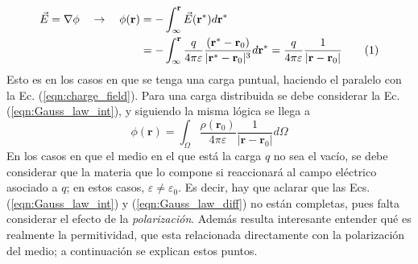 \documentclass[12pt, oneside, numbers, spanish]{ezthesis}
\newcommand\numberthis{\addtocounter{equation}{1}\tag{\theequation}}
\numberwithin{equation}{section}
\begin{document}
\begin{align*}\label{eqn:potential}
\vec{E} = \nabla\phi \quad\rightarrow\quad\phi{(\mathbf{r})} & = -\int_\infty^{\mathbf{r}} \vec{E}(\mathbf{r}^*) d\mathbf{r}^* \\
& = -\int_\infty^{\mathbf{r}} \frac{q}{4\pi\varepsilon}\frac{(\mathbf{r}^*-\mathbf{r}_0)}{|\mathbf{r}^* - \mathbf{r}_0|^3} d\mathbf{r}^* = \frac{q}{4\pi\varepsilon}\frac{1}{|\mathbf{r} - \mathbf{r}_0|}\numberthis
\end{align*}
Esto es en los casos en que se tenga una carga puntual, haciendo el paralelo con la Ec. (\ref{eqn:charge_field}). Para una carga distribuida se debe considerar la Ec. (\ref{eqn:Gauss_law_int}), y siguiendo la misma lógica se llega a
\begin{equation}\label{eqn:integral_potential}
\phi(\mathbf{r}) = \int_\Omega \frac{\rho(\mathbf{r}_0)}{4\pi\varepsilon}\frac{1}{|\mathbf{r}-\mathbf{r}_0|}d\Omega
\end{equation}
En los casos en que el medio en el que está la carga $q$ no sea el vacío, se debe considerar que la materia que lo compone si reaccionará al campo eléctrico asociado a $q$; en estos casos, $\varepsilon \neq \varepsilon_0$. Es decir, hay que aclarar que las Ecs. (\ref{eqn:Gauss_law_int}) y (\ref{eqn:Gauss_law_diff}) no están completas, pues falta considerar el efecto de la \textit{polarización}. Además resulta interesante entender qué es realmente la permitividad, que esta relacionada directamente con la polarización del medio; a continuación se explican estos puntos.
\end{document}
